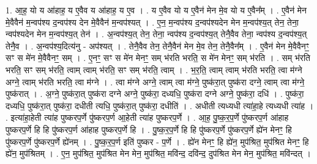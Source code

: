 \documentclass[17pt]{extarticle}
\begin{document}
1. आ॒ह॒ यो य आ॑हाह॒ य ए॒वैव य आ॑हाह॒ य ए॒व । . य ए॒वैव यो य ए॒वैन॑ मेन मे॒व यो य ए॒वैन᳚म् । . ए॒वैन॑ मेन मे॒वैवैन॑ म॒न्वप॑श्य द॒न्वप॑श्य देन मे॒वैवैन॑ म॒न्वप॑श्यत् । . ए॒न॒ म॒न्वप॑श्य द॒न्वप॑श्यदेन मेन म॒न्वप॑श्य॒त् तेन॒ तेना॒ न्वप॑श्यदेन मेन म॒न्वप॑श्य॒त् तेन॑ । . अ॒न्वप॑श्य॒त् तेन॒ तेना॒ न्वप॑श्य द॒न्वप॑श्य॒त् तेनै॒वैव तेना॒ न्वप॑श्य द॒न्वप॑श्य॒त् तेनै॒व । . अ॒न्वप॑श्य॒दित्य॑नु - अप॑श्यत् । . तेनै॒वैव तेन॒ तेनै॒वैन॑ मेन मे॒व तेन॒ तेनै॒वैन᳚म् । . ए॒वैन॑ मेन मे॒वैवैनꣳ॒॒ सꣳ स मे॑न मे॒वैवैनꣳ॒॒ सम् । . ए॒नꣳ॒॒ सꣳ स मे॑न मेनꣳ॒॒ सम् भ॑रति भरति॒ स मे॑न मेनꣳ॒॒ सम् भ॑रति । . सम् भ॑रति भरति॒ सꣳ सम् भ॑रति॒ त्वाम् त्वाम् भ॑रति॒ सꣳ सम् भ॑रति॒ त्वाम् । . भ॒र॒ति॒ त्वाम् त्वाम् भ॑रति भरति॒ त्वा म॑ग्ने अग्ने॒ त्वाम् भ॑रति भरति॒ त्वा म॑ग्ने । . त्वा म॑ग्ने अग्ने॒ त्वाम् त्वा म॑ग्ने॒ पुष्क॑रा॒त् पुष्क॑रा दग्ने॒ त्वाम् त्वा म॑ग्ने॒ पुष्क॑रात् । . अ॒ग्ने॒ पुष्क॑रा॒त् पुष्क॑रा दग्ने अग्ने॒ पुष्क॑रा॒ दध्यधि॒ पुष्क॑रा दग्ने अग्ने॒ पुष्क॑रा॒ दधि॑ । . पुष्क॑रा॒ दध्यधि॒ पुष्क॑रा॒त् पुष्क॑रा॒ दधीती त्यधि॒ पुष्क॑रा॒त् पुष्क॑रा॒ दधीति॑ । . अधीती त्यध्यधी त्या॑हा॒हे त्यध्यधी त्या॑ह । . इत्या॑हा॒हेती त्या॑ह पुष्करप॒र्णे पु॑ष्करप॒र्ण आ॒हेती त्या॑ह पुष्करप॒र्णे । . आ॒ह॒ पु॒ष्क॒र॒प॒र्णे पु॑ष्करप॒र्ण आ॑हाह पुष्करप॒र्णे हि हि पु॑ष्करप॒र्ण आ॑हाह पुष्करप॒र्णे हि । . पु॒ष्क॒र॒प॒र्णे हि हि पु॑ष्करप॒र्णे पु॑ष्करप॒र्णे ह्ये॑न मेनꣳ॒॒ हि पु॑ष्करप॒र्णे पु॑ष्करप॒र्णे ह्ये॑नम् । . पु॒ष्क॒र॒प॒र्ण इति॑ पुष्कर - प॒र्णे । . ह्ये॑न मेनꣳ॒॒ हि ह्ये॑न॒ मुप॑श्रित॒ मुप॑श्रित मेनꣳ॒॒ हि ह्ये॑न॒ मुप॑श्रितम् । . ए॒न॒ मुप॑श्रित॒ मुप॑श्रित मेन मेन॒ मुप॑श्रित॒ मवि॑न्द॒ दवि॑न्द॒ दुप॑श्रित मेन मेन॒ मुप॑श्रित॒ मवि॑न्दत् । \newline
\end{document}

